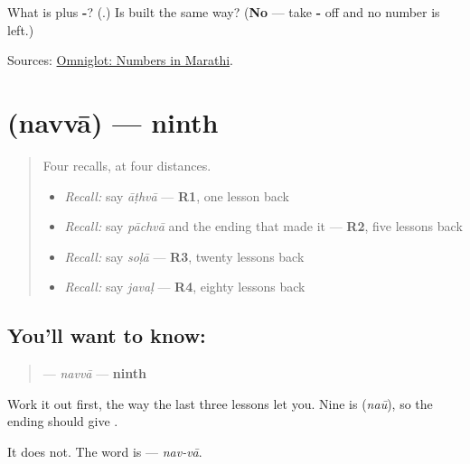 \begin{tcolorbox}[breakable,colback=teal!4,colframe=teal!35!black,title={Before you move on}]
What is \textbf{} plus \textbf{-}? (\textbf{}.) Is \textbf{} built the same way? (\textbf{No} — take \textbf{-} off and no number is left.)

Sources: \href{https://www.omniglot.com/language/numbers/marathi.htm}{Omniglot: Numbers in Marathi}.
\end{tcolorbox}
\section[\texorpdfstring{\mr{नववा} (navvā)}{नववा (navvā)}]{ (navvā) — ninth}

\label{lesson:MR-C61-navva}



\begin{quote}
Four recalls, at four distances.

\begin{itemize}
\raggedright
  \item \emph{Recall:} say \emph{āṭhvā} — \textbf{R1}, one lesson back
  \item \emph{Recall:} say \emph{pāchvā} and the ending that made it — \textbf{R2}, five lessons back
  \item \emph{Recall:} say \emph{soḷā} — \textbf{R3}, twenty lessons back
  \item \emph{Recall:} say \emph{javaḷ} — \textbf{R4}, eighty lessons back
\end{itemize}
\end{quote}

\subsection*{You'll want to know: }
\begin{quote}
\textbf{} — \emph{navvā} — \textbf{ninth}
\end{quote}

Work it out first, the way the last three lessons let you. Nine is \textbf{} (\emph{naū}), so the ending should give \textbf{}.

It does not. The word is \textbf{} — \emph{nav-vā}.

